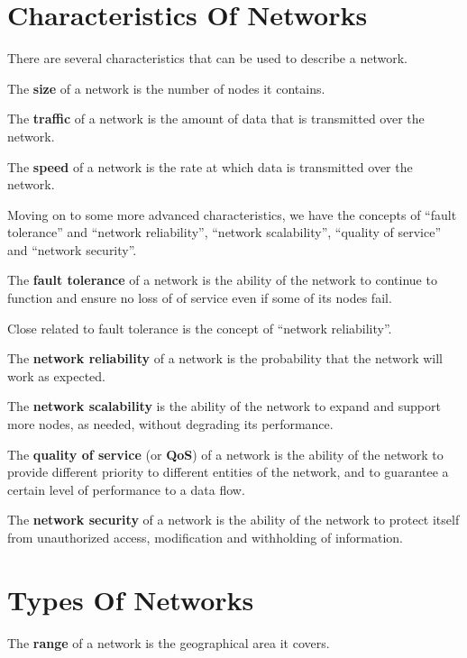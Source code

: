 \section{Characteristics Of Networks}

There are several characteristics that can be used to describe a network.

The \textbf{size} of a network is the number of nodes it contains.
\ed

The \textbf{traffic} of a network is the amount of data that is transmitted over the network.
\ed

The \textbf{speed} of a network is the rate at which data is transmitted over the network.
\ed

Moving on to some more advanced characteristics, we have the concepts of ``fault tolerance'' and ``network
reliability'',
``network scalability'', ``quality of service'' and ``network security''.

The \textbf{fault tolerance} of a network is the ability of the network to continue to function and ensure no loss of
of service even if some of its nodes fail.
\ed

Close related to fault tolerance is the concept of ``network reliability''.

The \textbf{network reliability} of a network is the probability that the network will work as expected.
\ed

The \textbf{network scalability} is the ability of the network to expand and support more nodes, as needed, without
degrading its performance.
\ed

The \textbf{quality of service} (or \textbf{QoS}) of a network is the ability of the network to provide different
priority to different entities of the network, and to guarantee a certain level of performance to a data flow.
\ed

The \textbf{network security} of a network is the ability of the network to protect itself from unauthorized access,
modification and withholding of information.
\ed

\section{Types Of Networks}

The \textbf{range} of a network is the geographical area it covers.
\ed

